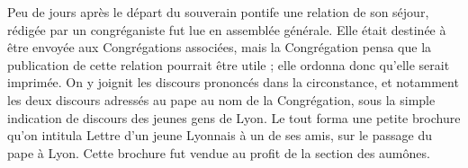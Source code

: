 Peu de jours après le départ du souverain pontife une relation de
son séjour, rédigée par un congréganiste fut lue en assemblée générale. Elle était destinée à être envoyée aux Congrégations associées, mais la Congrégation pensa que la publication de cette relation pourrait être utile ; elle ordonna donc qu'elle serait imprimée. On y joignit les discours prononcés dans la circonstance, et notamment les deux discours adressés au pape au nom de la Congrégation, sous la simple indication de discours des jeunes gens de Lyon. Le tout forma une petite brochure qu'on intitula Lettre d'un jeune Lyonnais à un de ses amis, sur le passage du pape à Lyon. Cette brochure fut vendue au profit de la section des aumônes.
